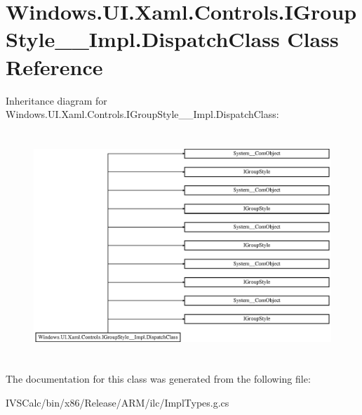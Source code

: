 \hypertarget{class_windows_1_1_u_i_1_1_xaml_1_1_controls_1_1_i_group_style_____impl_1_1_dispatch_class}{}\section{Windows.\+U\+I.\+Xaml.\+Controls.\+I\+Group\+Style\+\_\+\+\_\+\+Impl.\+Dispatch\+Class Class Reference}
\label{class_windows_1_1_u_i_1_1_xaml_1_1_controls_1_1_i_group_style_____impl_1_1_dispatch_class}
Inheritance diagram for Windows.\+U\+I.\+Xaml.\+Controls.\+I\+Group\+Style\+\_\+\+\_\+\+Impl.\+Dispatch\+Class\+:\begin{figure}[H]
\begin{center}
\leavevmode
\includegraphics[height=8.603352cm]{class_windows_1_1_u_i_1_1_xaml_1_1_controls_1_1_i_group_style_____impl_1_1_dispatch_class}
\end{center}
\end{figure}


The documentation for this class was generated from the following file\+:\begin{DoxyCompactItemize}
\item 
I\+V\+S\+Calc/bin/x86/\+Release/\+A\+R\+M/ilc/Impl\+Types.\+g.\+cs\end{DoxyCompactItemize}

